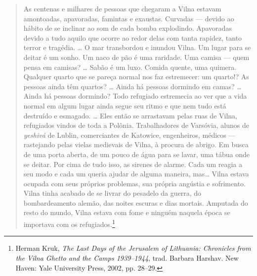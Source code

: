 \begin{quote}
As centenas e milhares de pessoas que chegaram a Vilna estavam
amontoadas, apavoradas, famintas e exaustas. Curvadas --- devido ao hábito
de se inclinar ao som de cada bomba explodindo. Apavoradas devido a tudo
aquilo que ocorre ao redor delas com tanta rapidez, tanto terror e
tragédia. \ldots{} O mar transbordou e inundou Vilna. Um lugar para se
deitar é um sonho. Um naco de pão é uma raridade. Uma camisa --- quem
pensa em camisas? \ldots{} Sabão é um luxo. Comida quente, uma quimera.
Qualquer quarto que se pareça normal nos faz estremecer: um quarto!? As
pessoas ainda têm quartos? \ldots{} Ainda há pessoas dormindo em camas?
\ldots{} Ainda há pessoas dormindo? Todo refugiado estremecia ao ver que
a vida normal em algum lugar ainda segue seu ritmo e que nem tudo está
destruído e esmagado. \ldots{} Eles então se arrastavam pelas ruas de
Vilna, refugiados vindos de toda a Polônia. Trabalhadores de Varsóvia,
alunos de \textit{yeshivá} de Lublin, comerciantes de Katowice, engenheiros,
médicos --- rastejando pelas vielas medievais de Vilna, à procura de
abrigo. Em busca de uma porta aberta, de um pouco de água para se lavar,
uma tábua onde se deitar. Por cima de tudo isso, as sirenes de alarme.
Cada um reagia a seu modo e cada um queria ajudar de alguma maneira,
mas\ldots{} Vilna estava ocupada com seus próprios problemas, sua
própria angústia e sofrimento. Vilna tinha acabado de se livrar do
pesadelo da guerra, do bombardeamento alemão, das noites escuras e dias
mortais. Amputada do resto do mundo, Vilna estava com fome e ninguém
naquela época se importava com os refugiados.\footnote{Herman Kruk, \textit{The Last Days of the Jerusalem of Lithuania: Chronicles from the Vilna Ghetto and the Camps 1939--1944}, trad. Barbara Harshav. New Haven: Yale University Press, 2002, pp. 28--29.}
\end{quote}

